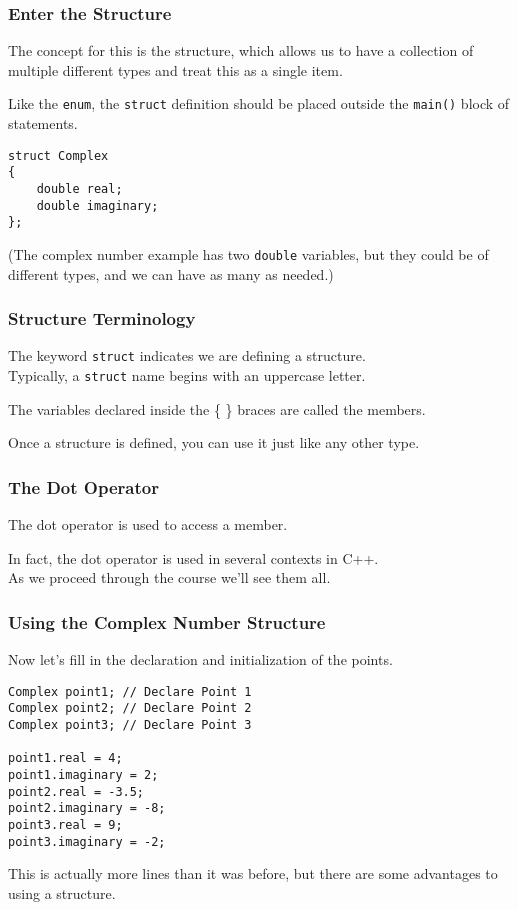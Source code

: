\begin{frame}[fragile]
\frametitle{Enter the Structure}

The concept for this is the \alert{structure}, which allows us to have a collection of multiple different types and treat this as a single item.

Like the \texttt{enum}, the \texttt{struct} definition should be placed outside the \texttt{main()} block of statements.

\begin{verbatim}
struct Complex
{
    double real;
    double imaginary;
};
\end{verbatim}

(The complex number example has two \texttt{double} variables, but they could be of different types, and we can have as many as needed.)

\end{frame}

\begin{frame}
\frametitle{Structure Terminology}
The keyword \texttt{struct} indicates we are defining a structure.\\
\quad Typically, a \texttt{struct} name begins with an uppercase letter.

The variables declared inside the \{ \} braces are called the \alert{members}.

Once a structure is defined, you can use it just like any other type.

\end{frame}

\begin{frame}
\frametitle{The Dot Operator}
The \alert{dot operator} is used to access a member.

In fact, the dot operator is used in several contexts in C++.\\
\quad As we proceed through the course we'll see them all.

\end{frame}

\begin{frame}[fragile]
\frametitle{Using the Complex Number Structure}

Now let's fill in the declaration and initialization of the points.

\begin{verbatim}
Complex point1; // Declare Point 1
Complex point2; // Declare Point 2
Complex point3; // Declare Point 3

point1.real = 4;
point1.imaginary = 2;
point2.real = -3.5;
point2.imaginary = -8;
point3.real = 9;
point3.imaginary = -2;

\end{verbatim}

This is actually more lines than it was before, but there are some advantages to using a structure.

\end{frame}

